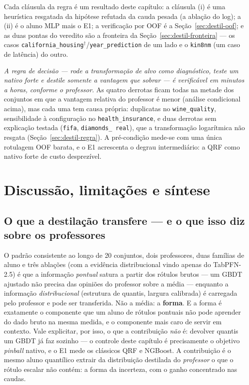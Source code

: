 Cada cláusula da regra é um resultado deste capítulo: a cláusula (i)
é uma heurística resgatada da hipótese refutada da cauda pesada (a
ablação do log); a (ii) é o aluno MLP mais o E1; a verificação por
OOF é a Seção~\ref{sec:destil-oof}; e as duas pontas do veredito são a
fronteira da Seção~\ref{sec:destil-fronteira} --- os casos
\texttt{california\_\allowbreak housing}$^\dagger$/\texttt{year\_\allowbreak prediction} de um lado e o
\texttt{kin8nm} (um caso de latência) do outro.

\emph{A regra de decisão --- rode a transformação de alvo como
diagnóstico, teste um nativo forte e destile somente a vantagem que
sobrar --- é verificável em minutos a horas, conforme o
professor.} As quatro derrotas ficam todas na metade dos conjuntos em
que a vantagem relativa do professor é menor (análise condicional
acima), mas cada uma tem causa própria: duplicatas no
\texttt{wine\_quality}, sensibilidade à configuração no
\texttt{health\_\allowbreak insurance}, e duas derrotas sem
explicação testada (\texttt{fifa}, \texttt{diamonds\_\allowbreak
real}), que a transformação logarítmica não resgata
(Seção~\ref{sec:destil-regra}). A
pré-condição mede-se com uma única rotulagem OOF barata, e o E1
acrescenta o degrau intermediário: a QRF como nativo forte de custo
desprezível.

\section{Discussão, limitações e síntese}
\label{sec:destil-discussao}

\subsection{O que a destilação transfere --- e o que isso diz sobre os
professores}
\label{sec:destil-transfere}

O padrão consistente ao longo de 20 conjuntos, dois professores, duas
famílias de aluno e três ablações (com a evidência distribucional
vindo apenas do TabPFN-2.5) é que a informação \emph{pontual}
satura a partir dos rótulos brutos --- um GBDT ajustado não precisa das
opiniões do professor sobre a média --- enquanto a informação
\emph{distribucional} (estrutura de quantis, largura calibrada) é
carregada pelo professor e pode ser transferida. Não a média: a \textbf{forma}. E
a forma é exatamente o componente que um aluno de rótulos pontuais não
pode aprender do dado bruto na mesma medida, e o componente mais caro
de servir em contexto. Vale explicitar, por isso, o que a contribuição
\emph{não} é: devolver quantis um GBDT já faz sozinho --- o controle
deste capítulo é precisamente o objetivo \emph{pinball} nativo, e o E1
mede os clássicos QRF e NGBoost. A contribuição é o mesmo aluno
quantílico extrair da distribuição destilada do \emph{professor} o que
o rótulo escalar não contém: a forma da incerteza, com o ganho
concentrado nas caudas.

